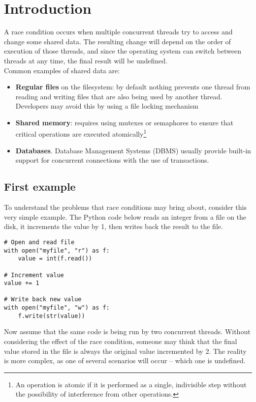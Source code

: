 \section{Introduction}

A race condition occurs when multiple concurrent threads try to access and change some shared data. The resulting change will depend on the order of execution of those threads, and since the operating system can switch between threads at any time, the final result will be undefined.\\

Common examples of shared data are:
\begin{itemize}
  \item \textbf{Regular files} on the filesystem: by default nothing prevents one thread from reading and writing files that are also being used by another thread. Developers may avoid this by using a file locking mechanism
  \item \textbf{Shared memory}: requires using mutexes or semaphores to ensure that critical operations are executed atomically\footnote{An operation is atomic if it is performed as a single, indivisible step without the possibility of interference from other operations.}
  \item \textbf{Databases}. Database Management Systems (DBMS) usually provide built-in support for concurrent connections with the use of transactions.
\end{itemize}

\subsection{First example}

To understand the problems that race conditions may bring about, consider this very simple example. The Python code below reads an integer from a file on the disk, it increments the value by 1, then writes back the result to the file.

\begin{verbatim}
# Open and read file
with open("myfile", "r") as f:
    value = int(f.read())

# Increment value
value += 1

# Write back new value
with open("myfile", "w") as f:
    f.write(str(value))
\end{verbatim}

Now assume that the same code is being run by two concurrent threads. Without considering the effect of the race condition, someone may think that the final value stored in the file is always the original value incremented by 2. The reality is more complex, as one of several scenarios will occur -- which one is undefined.

